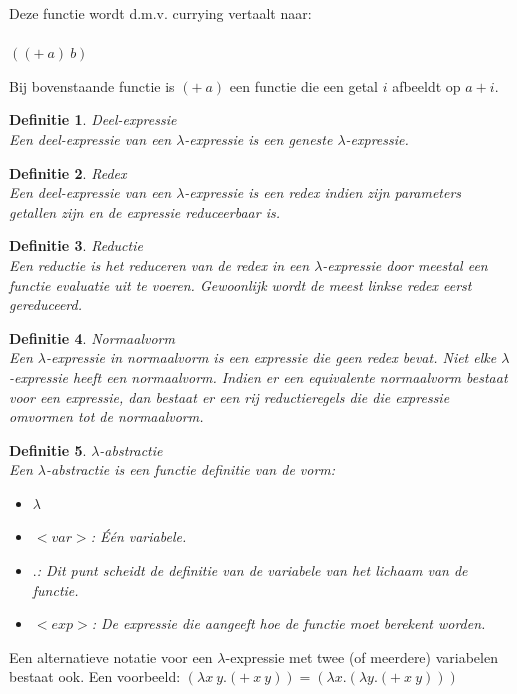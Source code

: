 \documentclass[a4paper]{article}
\newtheorem{tdefinitie}{Definitie}[section]
\newenvironment{definitie}[1]%
  {\begin{mdframed}[backgroundcolor=silver,
    topline=false,
    rightline=false,
    leftline=false,
    bottomline=false]\begin{tdefinitie}#1\\\normalfont}%
  {\end{tdefinitie}\end{mdframed}}
\newcommand{\nat}{\ensuremath{\mathbb{N}}}
\begin{document}
Deze functie wordt d.m.v. currying vertaalt naar:\\
\bm{$+: \nat \rightarrow (\nat \rightarrow \nat)$}\\
$((+\ a)\ b)$

Bij bovenstaande functie is $(+\ a)$ een functie die een getal $i$ afbeeldt op $a + i$.

\begin{definitie}{Deel-expressie}
  Een deel-expressie van een $\lambda$-expressie is een geneste $\lambda$-expressie.
\end{definitie}

\begin{definitie}{Redex}
  Een deel-expressie van een $\lambda$-expressie is een redex indien zijn parameters getallen zijn en de expressie reduceerbaar is.
\end{definitie}

\begin{definitie}{Reductie}
  Een reductie is het reduceren van de redex in een $\lambda$-expressie door meestal een functie evaluatie uit te voeren. Gewoonlijk wordt de meest linkse redex eerst gereduceerd.
\end{definitie}

\begin{definitie}{Normaalvorm}
  Een $\lambda$-expressie in normaalvorm is een expressie die geen redex bevat. Niet elke $\lambda$-expressie heeft een normaalvorm. Indien er een equivalente normaalvorm bestaat voor een expressie, dan bestaat er een rij reductieregels die die expressie omvormen tot de normaalvorm.
\end{definitie}

\begin{definitie}{$\lambda$-abstractie}
  Een $\lambda$-abstractie is een functie definitie van de vorm:
  \begin{itemize}
  \item $\lambda$
  \item $<var>$: \'E\'en variabele.
  \item $.$: Dit punt scheidt de definitie van de variabele van het lichaam van de functie.
  \item $<exp>$: De expressie die aangeeft hoe de functie moet berekent worden.
  \end{itemize}
\end{definitie}

Een alternatieve notatie voor een $\lambda$-expressie met twee (of meerdere) variabelen bestaat ook. Een voorbeeld: $(\lambda x\ y.(+\ x\ y)) = (\lambda x.(\lambda y.(+\ x\ y)))$
\end{document}

